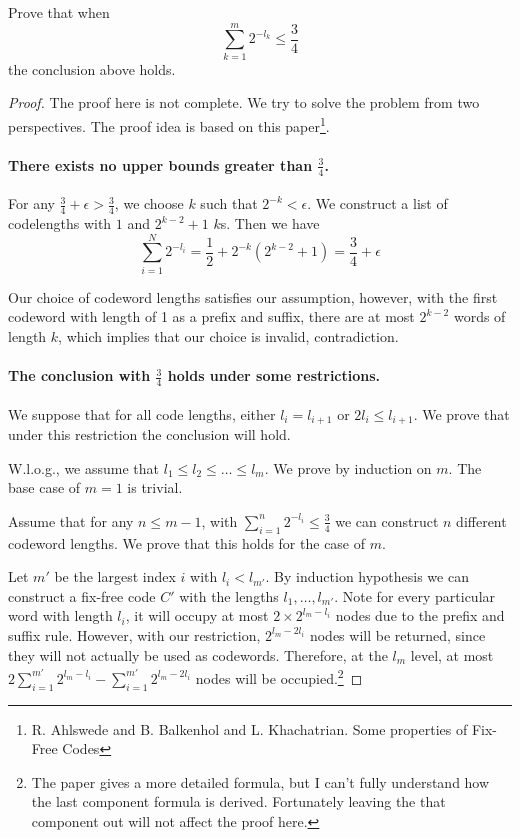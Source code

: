 \begin{exercise}{ Prove that when
  $$\sum_{k=1}^{m} 2^{-l_{k}} \leq \frac{3}{4}$$  the conclusion above holds.}
  \begin{proof} The proof here is not complete. We try to solve the problem from two perspectives. The proof idea is based on this paper\footnote{R. Ahlswede and B. Balkenhol and L. Khachatrian. Some properties of Fix-Free Codes}.
    \paragraph{There exists no upper bounds greater than $\frac{3}{4}$.} For any $\frac{3}{4}+\epsilon>\frac{3}{4}$, we choose $k$ such that $2^{-k}<\epsilon$. We construct a list of codelengths with $1$ and $2^{k-2}+1$ $k$s. Then we have
    \begin{equation}
      \sum_{i=1}^{N} 2^{-l_i} = \frac{1}{2}+ 2^{-k} (2^{k-2}+1) = \frac{3}{4}+\epsilon
    \end{equation}

    Our choice of codeword lengths satisfies our assumption, however, with the first codeword with length of 1 as a prefix and suffix, there are at most $2^{k-2}$ words of length $k$, which implies that our choice is invalid, contradiction. 

    \paragraph{The conclusion with $\frac{3}{4}$ holds under some restrictions.} We suppose that for all code lengths, either $l_i = l_{i+1}$ or $2l_i \le l_{i+1}$. We prove that under this restriction the conclusion will hold.

    W.l.o.g., we assume that $l_1 \le l_2 \le \ldots \le l_m$. We prove by induction on $m$. The base case of $m=1$ is trivial.

    Assume that for any $n\le m-1$, with $\sum_{i=1}^{n} 2^{-l_i} \le \frac{3}{4}$ we can construct $n$ different codeword lengths. We prove that this holds for the case of $m$.
    
    Let $m'$ be the largest index $i$ with $l_i < l_{m'}$. By induction hypothesis we can construct a fix-free code $C'$ with the lengths $l_1, \ldots, l_{m'}$. Note for every particular word with length $l_i$, it will occupy at most $2\times 2^{l_{m}-l_i}$ nodes due to the prefix and suffix rule. However, with our restriction, $2^{l_m - 2l_i}$ nodes will be returned, since they will not actually be used as codewords. Therefore, at the $l_m$ level, at most $2 \sum_{i=1}^{m'} 2^{l_m-l_i}- \sum_{i=1}^{m'}2^{l_{m} - 2l_i}$ nodes will be occupied.\footnote{The paper gives a more detailed formula, but I can't fully understand how the last component formula is derived. Fortunately leaving the that component out will not affect the proof here. }


\end{proof}
\end{exercise}
